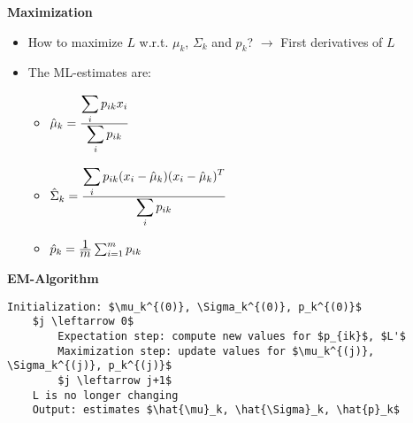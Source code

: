 \textbf{Maximization}
\begin{itemize}
    \item
        How to maximize $L$ w.r.t. $\mu_k$, $\Sigma_k$ and $p_k$? $\rightarrow$ First derivatives of $L$
    \item
        The ML-estimates are:
        \begin{itemize}
            \item
                $\hat{\mu}_k = \frac{\displaystyle \sum_i p_{ik} x_i}{\displaystyle \sum_i p_{ik}}$
            \item
                $\hat{\Sigma}_k = \frac{\displaystyle \sum_i p_{ik} (x_i-\hat{\mu}_k) (x_i - \hat{\mu}_k)^T}{\displaystyle \sum_i p_{ik}}$
            \item
                $\hat{p}_k = \frac{\displaystyle 1}{\displaystyle m} \sum_{i=1}^m p_{ik}$
        \end{itemize}
\end{itemize}
\textbf{EM-Algorithm}
\begin{lstlisting}[mathescape]
    Initialization: $\mu_k^{(0)}, \Sigma_k^{(0)}, p_k^{(0)}$
    $j \leftarrow 0$
        Expectation step: compute new values for $p_{ik}$, $L'$
        Maximization step: update values for $\mu_k^{(j)}, \Sigma_k^{(j)}, p_k^{(j)}$
        $j \leftarrow j+1$
    L is no longer changing
    Output: estimates $\hat{\mu}_k, \hat{\Sigma}_k, \hat{p}_k$
\end{lstlisting}

